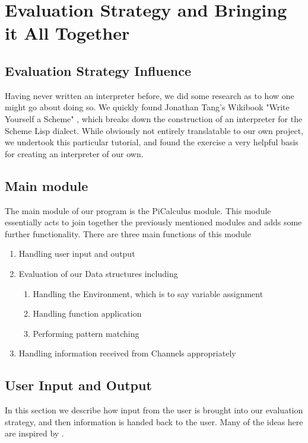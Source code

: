 \section{Evaluation Strategy and Bringing it All Together}
\label{sec:main}
\subsection{Evaluation Strategy Influence}
Having never written an interpreter before, we did some research as to how one might go about doing so. We quickly found Jonathan Tang's Wikibook "Write Yourself a Scheme" \cite{wyas}, which breaks down the construction of an interpreter for the Scheme Lisp dialect. While obviously not entirely translatable to our own project, we undertook this particular tutorial, and found the exercise a very helpful basis for creating an interpreter of our own.

\subsection{Main module}
The main module of our program is the PiCalculus module. This module essentially acts to join together the previously mentioned modules and adds some further functionality. 
There are three main functions of this module
\begin{enumerate}
    \item Handling user input and output
    \item Evaluation of our Data structures including
        \begin{enumerate}
            \item Handling the Environment, which is to say variable assignment
            \item Handling function application
            \item Performing pattern matching
        \end{enumerate}
    \item Handling information received from Channels appropriately
\end{enumerate}

\subsection{User Input and Output}

In this section we describe how input from the user is brought into our evaluation strategy, and then information is handed back to the user. Many of the ideas here are inspired by \cite{wyas}.

